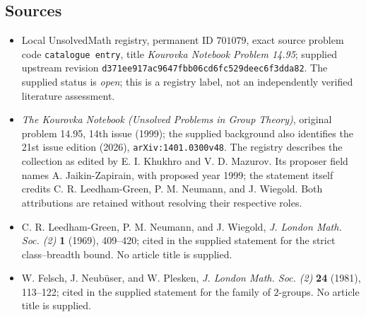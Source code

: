 \documentclass[11pt]{article}
\begin{document}
\subsection{Sources}
\begin{itemize}
\item Local UnsolvedMath registry, permanent ID \(701079\), exact source problem code \texttt{catalogue entry}, title \emph{Kourovka Notebook Problem 14.95}; supplied upstream revision \texttt{d371ee917ac9647fbb06cd6fc529deec6f3dda82}. The supplied status is \emph{open}; this is a registry label, not an independently verified literature assessment.
\item \emph{The Kourovka Notebook (Unsolved Problems in Group Theory)}, original problem 14.95, 14th issue (1999); the supplied background also identifies the 21st issue edition (2026), \texttt{arXiv:1401.0300v48}. The registry describes the collection as edited by E. I. Khukhro and V. D. Mazurov. Its proposer field names A. Jaikin-Zapirain, with proposed year 1999; the statement itself credits C. R. Leedham-Green, P. M. Neumann, and J. Wiegold. Both attributions are retained without resolving their respective roles.
\item C. R. Leedham-Green, P. M. Neumann, and J. Wiegold, \emph{J. London Math. Soc. (2)} \textbf{1} (1969), 409--420; cited in the supplied statement for the strict class--breadth bound. No article title is supplied.
\item W. Felsch, J. Neub\"user, and W. Plesken, \emph{J. London Math. Soc. (2)} \textbf{24} (1981), 113--122; cited in the supplied statement for the family of \(2\)-groups. No article title is supplied.
\end{itemize}
\end{document}
